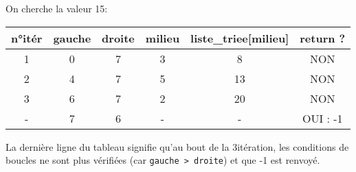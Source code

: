 On cherche la valeur 15:
\begin{center}

	\begin{tabular}{|c|c|c|c|c|c|}
		\hline
		{\ccell  n°itér} & {\ccell  gauche} & {\ccell  droite} & {\ccell  milieu} & {\ccell  liste\_triee[milieu]} & {\ccell  return ?} \\
		\hline
		1                                                  & 0                             & 7                             & 3                             & 8                                           & NON                             \\
		\hline
		2                                                  & 4                             & 7                             & 5                             & 13                                          & NON                             \\
		\hline
		3                                                  & 6                             & 7                             & 2                             & 20                                          & NON                             \\
		\hline
		-                                                  & 7                             & 6                             & -                             & -                                           & OUI : -1                        \\
		\hline
	\end{tabular}
\end{center}
La dernière ligne du tableau signifie qu'au bout de la 3\eme itération, les conditions de boucles ne sont plus vérifiées (car \texttt{gauche > droite}) et que -1 est renvoyé.
